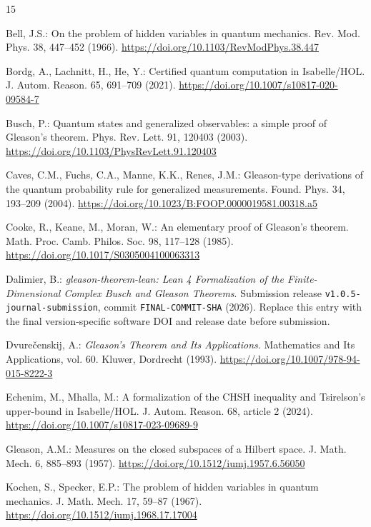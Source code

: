 \documentclass[pdflatex,sn-mathphys-num]{sn-jnl}
\theoremstyle{thmstyleone}
\theoremstyle{thmstylethree}
\begin{document}
\begin{thebibliography}{15}

 Bell, J.S.: On the problem of hidden variables in quantum mechanics. Rev. Mod. Phys. 38, 447--452 (1966). \url{https://doi.org/10.1103/RevModPhys.38.447}

 Bordg, A., Lachnitt, H., He, Y.: Certified quantum computation in Isabelle/HOL. J. Autom. Reason. 65, 691--709 (2021). \url{https://doi.org/10.1007/s10817-020-09584-7}

 Busch, P.: Quantum states and generalized observables: a simple proof of Gleason's theorem. Phys. Rev. Lett. 91, 120403 (2003). \url{https://doi.org/10.1103/PhysRevLett.91.120403}

 Caves, C.M., Fuchs, C.A., Manne, K.K., Renes, J.M.: Gleason-type derivations of the quantum probability rule for generalized measurements. Found. Phys. 34, 193--209 (2004). \url{https://doi.org/10.1023/B:FOOP.0000019581.00318.a5}

 Cooke, R., Keane, M., Moran, W.: An elementary proof of Gleason's theorem. Math. Proc. Camb. Philos. Soc. 98, 117--128 (1985). \url{https://doi.org/10.1017/S0305004100063313}

 Dalimier, B.: \emph{gleason-theorem-lean: Lean 4 Formalization of the Finite-Dimensional Complex Busch and Gleason Theorems}. Submission release \texttt{v1.0.5-journal-submission}, commit \texttt{FINAL-COMMIT-SHA} (2026). Replace this entry with the final version-specific software DOI and release date before submission.

 Dvure\v{c}enskij, A.: \emph{Gleason's Theorem and Its Applications}. Mathematics and Its Applications, vol. 60. Kluwer, Dordrecht (1993). \url{https://doi.org/10.1007/978-94-015-8222-3}

 Echenim, M., Mhalla, M.: A formalization of the CHSH inequality and Tsirelson's upper-bound in Isabelle/HOL. J. Autom. Reason. 68, article 2 (2024). \url{https://doi.org/10.1007/s10817-023-09689-9}

 Gleason, A.M.: Measures on the closed subspaces of a Hilbert space. J. Math. Mech. 6, 885--893 (1957). \url{https://doi.org/10.1512/iumj.1957.6.56050}

 Kochen, S., Specker, E.P.: The problem of hidden variables in quantum mechanics. J. Math. Mech. 17, 59--87 (1967). \url{https://doi.org/10.1512/iumj.1968.17.17004}


\end{thebibliography}
\end{document}
